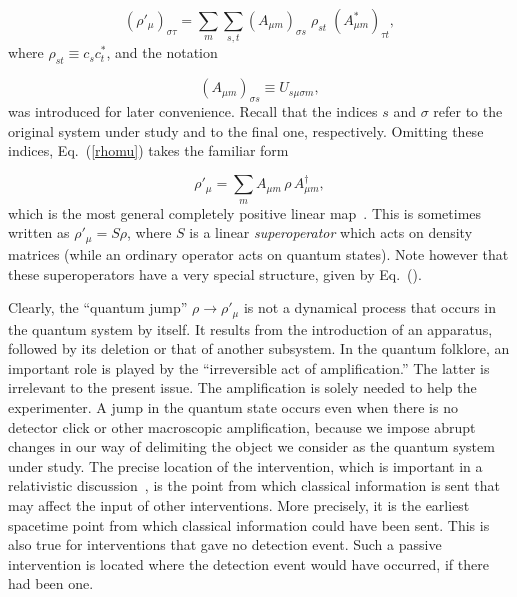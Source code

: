 \documentclass[12pt]{article}
\def\beq{\begin{equation}}
\def\eeq{\end{equation}}
\def\Eq{Eq.~(\ref}
\begin{document}
\beq (\rho'_\mu)_{\sigma\tau}=\sum_{m}\sum_{s,t}
 (A_{\mu m})_{\sigma s}\;\rho_{st}\;(A_{\mu m}^*)_{\tau t},
 \label{rhomu} \eeq
where $\rho_{st}\equiv c_sc_t^*$, and the notation

\beq (A_{\mu m})_{\sigma s}\equiv U_{s\mu\sigma m}, \label{AU}\eeq
was introduced for later convenience. Recall that the indices $s$ and
$\sigma$ refer to the original system under study and to the final one,
respectively. Omitting these indices, \Eq{rhomu}) takes the familiar
form

\beq \rho'_\mu=\sum_{m} A_{\mu m}\,\rho\,A_{\mu m}^\dagger,
 \label{ArhoA} \eeq
which is the most general completely positive linear map~\cite{choi}.
This is sometimes written as $\rho'_\mu=S\rho$, where $S$ is a linear
{\it super\-operator\/} which acts on density matrices (while an
ordinary operator acts on quantum states). Note however that these
super\-operators have a very special structure, given by
Eq.~(\theequation).

Clearly, the ``quantum jump'' $\rho\to\rho'_\mu$ is not a dynamical
process that occurs in the quantum system by itself. It results from the
introduction of an apparatus, followed by its deletion or that of
another subsystem. In the quantum folklore, an important role is played
by the ``irreversible act of amplification.'' The latter is irrelevant
to the present issue. The amplification is solely needed to help the
experimenter. A jump in the quantum state occurs even when there is no
detector click or other macroscopic amplification, because we impose
abrupt changes in our way of delimiting the object we consider as the
quantum system under study. The precise location of the intervention,
which is important in a relativistic discussion~\cite{II}, is the point
from which classical information is sent that may affect the input of
other interventions. More precisely, it is the earliest spacetime point
from which classical information could have been sent. This is also true
for interventions that gave no detection event. Such a passive
intervention is located where the detection event would have occurred,
if there had been one.
\end{document}

